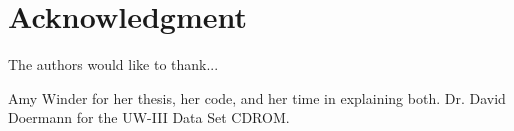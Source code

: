 \documentclass[conference]{IEEEtran}
\begin{document}
\section*{Acknowledgment}

The authors would like to thank...

Amy Winder for her thesis, her code, and her time in explaining both.  
Dr. David Doermann for the UW-III Data Set CDROM.



%
%
%
% 
% 
% 
% 
% 




\end{document}
